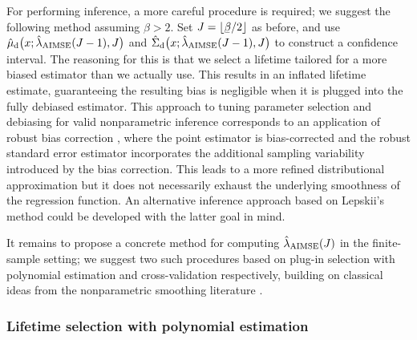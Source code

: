 For performing inference, a more careful procedure is required;
we suggest the following method assuming $\beta > 2$.
Set $J = \lfloor \flbeta / 2 \rfloor$ as before,
and use $\hat\mu_{\mathrm{d}}\big(x; \hat\lambda_{\operatorname{AIMSE}}(J-1), J\big)$
and $\hat\Sigma_{\mathrm{d}}\big(x; \hat\lambda_{\operatorname{AIMSE}}(J-1), J\big)$
to construct a confidence interval.
The reasoning for this is that we select a lifetime tailored
for a more biased estimator than we actually use.
This results in an inflated lifetime estimate, guaranteeing
the resulting bias is negligible when it is
plugged into the fully debiased estimator.
This approach to tuning parameter selection
and debiasing for valid nonparametric
inference corresponds to an application of robust bias correction
\citep{calonico2018jasa,calonico2022bernoulli},
where the point estimator is bias-corrected
and the robust standard error estimator incorporates the additional
sampling variability introduced by the bias correction.
This leads to a more refined distributional approximation
but it does not necessarily exhaust the underlying
smoothness of the regression function.
An alternative inference approach based on Lepskii's method
\citep{lepskii1992asymptotically,birge2001alternative}
could be developed with the latter goal in mind.

It remains to propose a concrete method for computing
$\hat\lambda_{\operatorname{AIMSE}}(J)$
in the finite-sample setting; we suggest two such procedures
based on plug-in selection with polynomial estimation and
cross-validation respectively,
building on classical ideas from the nonparametric
smoothing literature \citep{fan2020statistical}.

\subsubsection*{Lifetime selection with polynomial estimation}

